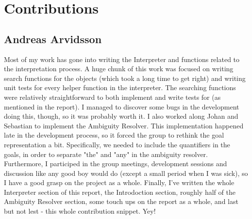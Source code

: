 \section*{Contributions}
\subsection*{Andreas Arvidsson}
Most of my work has gone into writing the Interpreter and functions related to the interpretation process.
A huge chunk of this work was focused on writing search functions for the objects (which took a long time to get right) and writing unit tests for every helper function in the interpreter.
The searching functions were relatively straightforward to both implement and write tests for (as mentioned in the report).
I managed to discover some bugs in the development doing this, though, so it was probably worth it.
\newline
\newline
I also worked along Johan and Sebastian to implement the Ambiguity Resolver.
This implementation happened late in the development process, so it forced the group to rethink the goal representation a bit. Specifically, we needed to include the quantifiers in the goals, in order to separate "the" and "any" in the ambiguity resolver.
\newline
\newline
Furthermore, I participed in the group meetings, development sessions and discussion like any good boy would do (except a small period when I was sick), so I have a good grasp on the project as a whole.
\newline
\newline
Finally, I've written the whole Interpreter section of this report, the Introdoction section, roughly half of the Ambiguity Resolver section, some touch ups on the report as a whole, and last but not lest - this whole contribution snippet. Yey!

